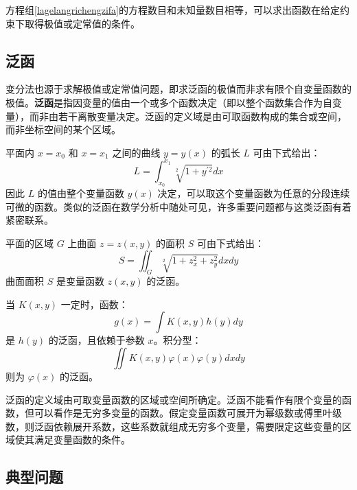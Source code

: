 \documentclass[cn,11pt,chinese,blue,bibstyle=ieeetr]{elegantbook}
\begin{document}
{方程组\ref{lagelangrichengzifa}的方程数目和未知量数目相等，可以求出函数在给定约束下取得极值或定常值的条件。


\subsection{泛函}
变分法也源于求解极值或定常值问题，即求泛函的极值而非求有限个自变量函数的极值。\textbf{泛函}是指因变量的值由一个或多个函数决定（即以整个函数集合作为自变量），而非由若干离散变量决定。泛函的定义域是由可取函数构成的集合或空间，而非坐标空间的某个区域。

\begin{example}
平面内 $x = x_0$ 和 $x = x_1$ 之间的曲线 $y = y(x)$ 的弧长 $L$ 可由下式给出：
	\begin{equation}\label{shortest_arc_length}
	L = \int_{x_0}^{x_1} {\sqrt[2]{1 + {y^{'2}}}}dx
	\end{equation}
因此 $L$ 的值由整个变量函数 $y(x)$ 决定，可以取这个变量函数为任意的分段连续可微的函数。类似的泛函在数学分析中随处可见，许多重要问题都与这类泛函有着紧密联系。
\end{example}

\begin{example}
平面的区域 $G$ 上曲面 $z = z(x, y)$ 的面积 $S$ 可由下式给出：
	\begin{equation}
	S = \iint_{G} {\sqrt[2]{1 + {z_x^2} + {z_y^2}}}dxdy \nonumber
	\end{equation}
曲面面积 $S$ 是变量函数 $z(x, y)$ 的泛函。
\end{example}

\begin{example}
当 $K(x, y)$ 一定时，函数：
	\begin{equation}
	g(x) = \int K(x, y)h(y)dy \nonumber
	\end{equation}
是 $h(y)$ 的泛函，且依赖于参数 $x$。积分型：
	\begin{equation}
	\iint {K(x, y) \varphi(x) \varphi(y)}dxdy \nonumber
	\end{equation}
则为 $\varphi(x)$ 的泛函。
\end{example}

泛函的定义域由可取变量函数的区域或空间所确定。泛函不能看作有限个变量的函数，但可以看作是无穷多变量的函数。假定变量函数可展开为幂级数或傅里叶级数，则泛函依赖展开系数，这些系数就组成无穷多个变量，需要限定这些变量的区域使其满足变量函数的条件。


\subsection{典型问题}

}
\end{document}
